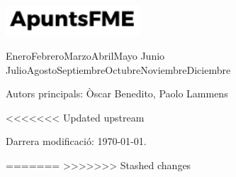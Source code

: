 \begin{titlepage}
	
	\vspace{2\baselineskip} %
	
	
	\vfill %
	
	
	\includegraphics[width=5cm]{../logo.pdf}
	
	\vspace{0.3\baselineskip} %
	
	
	{\ifcase \month \or Enero\or Febrero\or Marzo\or Abril\or Mayo \or Junio\or 
	Julio\or Agosto\or Septiembre\or Octubre\or Noviembre\or Diciembre\fi \:  
	\number \year} \let\Date\@date
	
	
	
\end{titlepage}

\vspace*{\fill}

\noindent Autors principals: Òscar Benedito, Paolo Lammens

\quad

\noindent %

<<<<<<< Updated upstream
\quad

\noindent %

\quad

\noindent Darrera modificació: \today.

\doclicenseThis
=======
\doclicenseThis
>>>>>>> Stashed changes
